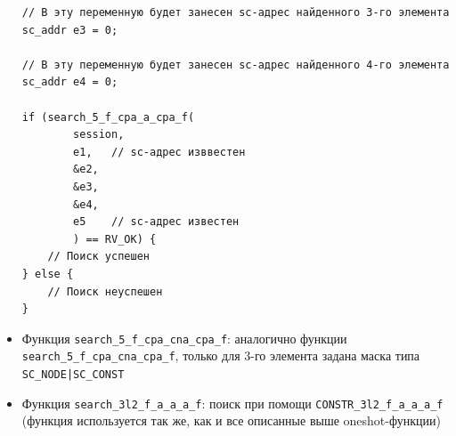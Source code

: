 \begin{itemize}
\begin{lstlisting}[texcl]
// В эту переменную будет занесен sc-адрес найденного 3-го элемента
sc_addr e3 = 0;

// В эту переменную будет занесен sc-адрес найденного 4-го элемента
sc_addr e4 = 0;

if (search_5_f_cpa_a_cpa_f(
        session,
        e1,   // sc-адрес изввестен
        &e2,
        &e3,
        &e4,
        e5    // sc-адрес известен
        ) == RV_OK) {
    // Поиск успешен
} else {
    // Поиск неуспешен
}
\end{lstlisting}

\item Функция \lstinline|search_5_f_cpa_сna_cpa_f|: аналогично функции
  \lstinline|search_5_f_cpa_сna_cpa_f|, только для 3-го элемента
  задана маска типа \lstinline+SC_NODE|SC_CONST+

\item Функция \lstinline|search_3l2_f_a_a_a_f|: поиск при помощи
  \lstinline|CONSTR_3l2_f_a_a_a_f| (функция используется так же, как и
  все описанные выше oneshot-функции)
\end{itemize}

